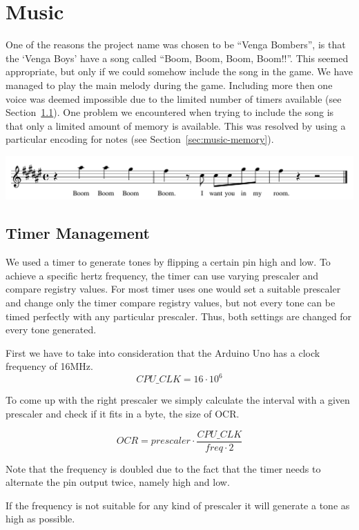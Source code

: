\section{Music}

One of the reasons the project name was chosen to be ``Venga Bombers'', is that
the `Venga Boys'\cite{venga-boys} have a song called ``Boom, Boom, Boom,
Boom!!''. This seemed appropriate, but only if we could somehow include the
song in the game. We have managed to play the main melody during the game.
Including more then one voice was deemed impossible due to the limited number
of timers available (see Section~\ref{sec:music-timer}). One problem we
encountered when trying to include the song is that only a limited amount of
memory is available. This was resolved by using a particular encoding for notes
(see Section~\ref{sec:music-memory}).


\includegraphics[width=\textwidth,height=\textheight,keepaspectratio]
  {res/boom.png}

\subsection{Timer Management}
\label{sec:music-timer}
We used a timer to generate tones by flipping a certain pin high and low. To
achieve a specific hertz frequency, the timer can use varying prescaler and
compare registry values. For most timer uses one would set a suitable prescaler
and change only the timer compare registry values, but not every tone can be
timed perfectly with any particular prescaler. Thus, both settings are changed
for every tone generated.

First we have to take into consideration that the Arduino Uno has a
clock frequency of 16MHz.
$$CPU\_CLK = 16 \cdot 10^6$$

To come up with the right prescaler we simply calculate the interval with a
given prescaler and check if it fits in a byte, the size of OCR.

$$OCR = prescaler \cdot \frac{CPU\_CLK}{freq \cdot 2}$$

Note that the frequency is doubled due to the fact that the timer needs to
alternate the pin output twice, namely high and low.

If the frequency is not suitable for any kind of prescaler it will generate
a tone as high as possible.

